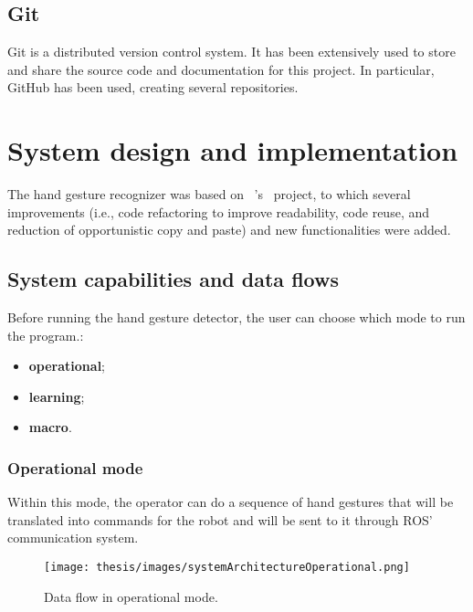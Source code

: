 \documentclass[../thesis.tex]{subfiles}
\begin{document}
\subsection{Git}
Git is a distributed version control system. It has been extensively used to store and share the source code and documentation for this project. In particular, GitHub has been used, creating several repositories.

\section{System design and implementation}\label{sec:system_design_and_implementation}
The hand gesture recognizer was based on ~\citeauthor{site:hand_gesture_base_repo}'s~\cite{site:hand_gesture_base_repo} project, to which several improvements (i.e., code refactoring to improve readability, code reuse, and reduction of opportunistic copy and paste) and new functionalities were added.

\subsection{System capabilities and data flows}
Before running the hand gesture detector, the user can choose which mode to run the program.:
\begin{itemize}
    \item \textbf{operational};
    \item \textbf{learning};
    \item \textbf{macro}.
\end{itemize}

\subsubsection{Operational mode}\label{sss:operational_mode}
Within this mode, the operator can do a sequence of hand gestures that will be translated into commands for the robot and will be sent to it through \acrshort{ROS}' communication system.
\begin{figure}[H]
    \centering
    \texttt{[image: thesis/images/systemArchitectureOperational.png]}
    \caption{Data flow in operational mode.}
    \label{fig:system_architecture_operational}
\end{figure}
\end{document}
